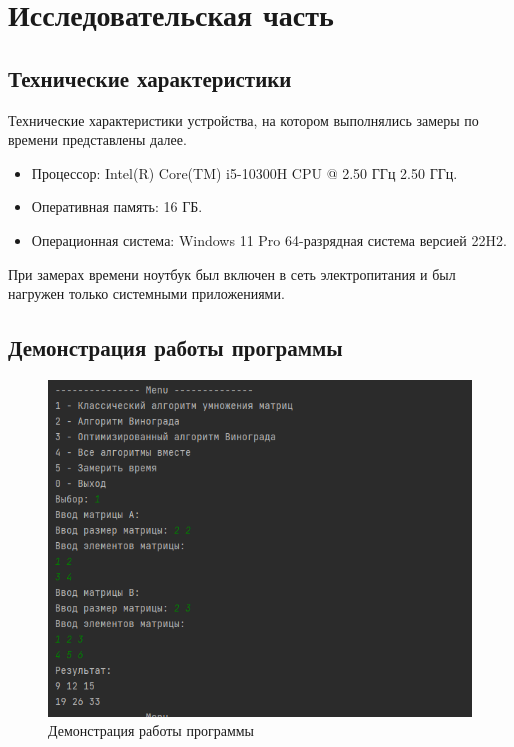 \chapter{Исследовательская часть}

\section{Технические характеристики}

Технические характеристики устройства, на котором выполнялись замеры по времени представлены далее.

\begin{itemize}
	\item Процессор: Intel(R) Core(TM) i5-10300H CPU @ 2.50 ГГц 2.50 ГГц. \cite{intel}
	\item Оперативная память: 16 ГБ.
	\item Операционная система: Windows 11 Pro 64-разрядная система версией 22H2. \cite{windows}
\end{itemize}

При замерах времени ноутбук был включен в сеть электропитания и был нагружен только системными приложениями.

\section{Демонстрация работы программы}

\begin{figure}[h]
	\centering
	\includegraphics[height=0.35\textheight]{img/example.png}
	\caption{Демонстрация работы программы}
	\label{img:demonstration}
\end{figure}

